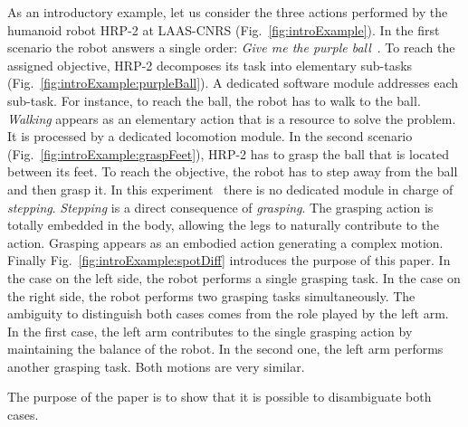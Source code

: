 \documentclass[letterpaper, 10pt, conference]{ieeeconf}      %
\begin{document}
As an introductory example, let us consider the three actions performed by the
humanoid robot HRP-2 at LAAS-CNRS (Fig.~\ref{fig:introExample}). In the first scenario the robot
answers a single order: \emph{Give me the purple ball}~\cite{yoshida07}. To reach the assigned
objective, HRP-2 decomposes its task into elementary sub-tasks
(Fig.~\ref{fig:introExample:purpleBall}). A dedicated software module addresses each
sub-task. For instance,
to reach the ball, the robot has to walk to the ball. \emph{Walking} appears as an
elementary action that is a resource to solve the problem. It is processed by a
dedicated locomotion module. In the second scenario (Fig.~\ref{fig:introExample:graspFeet}),
HRP-2 has to grasp the ball that is located between its feet. To reach the
objective, the robot has to step away from the ball and then grasp it. In this
experiment~\cite{kanoun10} there is no dedicated module in charge of \emph{stepping}. \emph{Stepping} is
a direct consequence of \emph{grasping}. The grasping action is totally embedded in
the body, allowing the legs to naturally contribute to the action. Grasping
appears as an embodied action generating a complex motion. Finally Fig.~\ref{fig:introExample:spotDiff}
introduces the purpose of this paper. In the case on the left side, the robot
performs a single grasping task. In the case on the right side, the robot
performs two grasping tasks simultaneously. The ambiguity to distinguish both
cases comes from the role played by the left arm. In the first case, the left
arm contributes to the single grasping action by maintaining the balance of the
robot. In the second one, the left arm performs another grasping task. Both
motions are very similar. 

The purpose of the paper is to show that it is possible to disambiguate both
cases.
\end{document}
